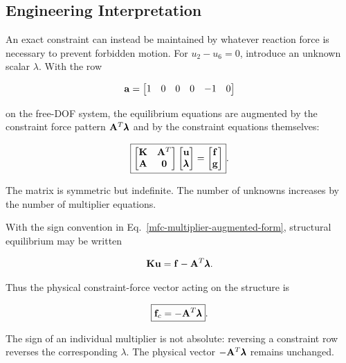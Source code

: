 \subsection{Engineering Interpretation}

An exact constraint can instead be maintained by whatever reaction force is
necessary to prevent forbidden motion. For $u_2-u_6=0$, introduce an unknown
scalar $\lambda$. With the row

\begin{equation}
    \mathbf{a}=\begin{bmatrix}1&0&0&0&-1&0\end{bmatrix}
\end{equation}

on the free-DOF system, the equilibrium equations are augmented by the
constraint force pattern $\mathbf{A}^T\pmb{\lambda}$ and by the constraint equations
themselves:

\begin{equation}\label{mfc-multiplier-augmented-form}
    \boxed{
    \begin{bmatrix}
        \mathbf{K} & \mathbf{A}^T\\
        \mathbf{A} & \mathbf{0}
    \end{bmatrix}
    \begin{bmatrix}
        \mathbf{u}\\\pmb{\lambda}
    \end{bmatrix}
    =
    \begin{bmatrix}
        \mathbf{f}\\\mathbf{g}
    \end{bmatrix}
    }.
\end{equation}

The matrix is symmetric but indefinite. The number of unknowns increases by the
number of multiplier equations.

With the sign convention in Eq.~\eqref{mfc-multiplier-augmented-form}, structural
equilibrium may be written

\begin{equation}
    \mathbf{K}\mathbf{u}=\mathbf{f}-\mathbf{A}^T\pmb{\lambda}.
\end{equation}

Thus the physical constraint-force vector acting on the structure is

\begin{equation}\label{mfc-constraint-force}
    \boxed{\mathbf{f}_c=-\mathbf{A}^T\pmb{\lambda}}.
\end{equation}

The sign of an individual multiplier is not absolute: reversing a constraint row
reverses the corresponding $\lambda$. The physical vector
$-\mathbf{A}^T\pmb{\lambda}$ remains unchanged.

